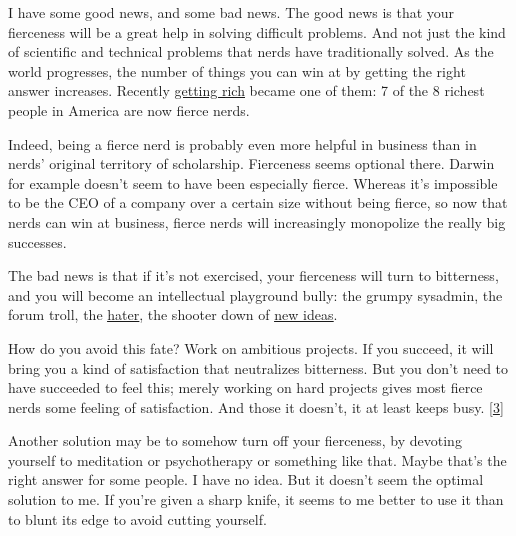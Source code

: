 I
                  have some good news, and some bad news. The good news is that
                  your fierceness will be a great help in solving difficult
                  problems. And not just the kind of scientific and technical
                  problems that nerds have traditionally solved. As the world
                  progresses, the number of things you can win at by getting the
                  right answer increases. Recently
                  \href{http://www.paulgraham.com/richnow.html}{\underline{getting rich}} became one of
                  them: 7 of the 8 richest people in America are now fierce
                  nerds.

Indeed, being a fierce nerd is probably even
                  more helpful in business than in nerds' original territory of
                  scholarship. Fierceness seems optional there. Darwin for
                  example doesn't seem to have been especially fierce. Whereas
                  it's impossible to be the CEO of a company over a certain size
                  without being fierce, so now that nerds can win at business,
                  fierce nerds will increasingly monopolize the really big
                  successes.

The bad news is that if it's not
                  exercised, your fierceness will turn to bitterness, and you
                  will become an intellectual playground bully: the grumpy
                  sysadmin, the forum troll, the
                  \href{http://www.paulgraham.com/fh.html}{\underline{hater}}, the shooter down of
                  \href{http://www.paulgraham.com/newideas.html}{\underline{new ideas}}.

How do you avoid this fate? Work on ambitious
                  projects. If you succeed, it will bring you a kind of
                  satisfaction that neutralizes bitterness. But you don't need
                  to have succeeded to feel this; merely working on hard
                  projects gives most fierce nerds some feeling of satisfaction.
                  And those it doesn't, it at least keeps busy.
                  [\href{\#f3n}{3}]

Another solution may be to somehow turn off your
                  fierceness, by devoting yourself to meditation or
                  psychotherapy or something like that. Maybe that's the right
                  answer for some people. I have no idea. But it doesn't seem
                  the optimal solution to me. If you're given a sharp knife, it
                  seems to me better to use it than to blunt its edge to avoid
                  cutting yourself.

